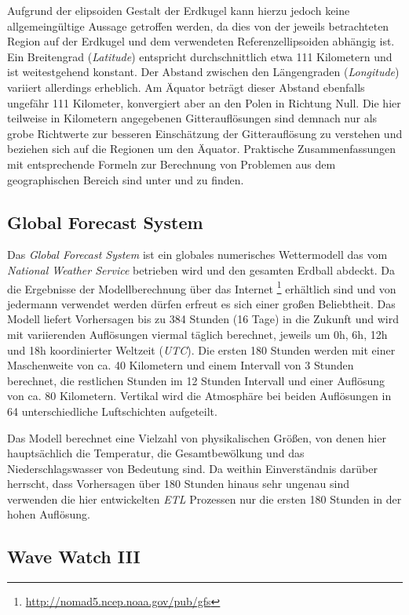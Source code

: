Aufgrund der elipsoiden Gestalt der Erdkugel kann hierzu jedoch keine
allgemeingültige Aussage getroffen werden, da dies von der jeweils
betrachteten Region auf der Erdkugel und dem verwendeten
Referenzellipsoiden abhängig ist. Ein Breitengrad (\textit{Latitude})
entspricht durchschnittlich etwa 111 Kilometern und ist weitestgehend
konstant. Der Abstand zwischen den Längengraden (\textit{Longitude})
variiert allerdings erheblich. Am Äquator beträgt dieser Abstand
ebenfalls ungefähr 111 Kilometer, konvergiert aber an den Polen in
Richtung Null. Die hier teilweise in Kilometern angegebenen
Gitterauflösungen sind demnach nur als grobe Richtwerte zur besseren
Einschätzung der Gitterauflösung zu verstehen und beziehen sich auf
die Regionen um den Äquator. Praktische Zusammenfassungen mit
entsprechende Formeln zur Berechnung von Problemen aus dem
geographischen Bereich sind unter \cite{aviation} und
\cite{movable_type_scripts} zu finden.

\subsection{Global Forecast System}

Das \textit{Global Forecast System} ist ein globales numerisches
Wettermodell das vom \textit{National Weather Service} betrieben wird
und den gesamten Erdball abdeckt. Da die Ergebnisse der
Modellberechnung über das Internet
\footnote{\url{http://nomad5.ncep.noaa.gov/pub/gfs}} erhältlich sind
und von jedermann verwendet werden dürfen erfreut es sich einer großen
Beliebtheit. Das Modell liefert Vorhersagen bis zu 384 Stunden (16
Tage) in die Zukunft und wird mit variierenden Auflösungen viermal
täglich berechnet, jeweils um 0h, 6h, 12h und 18h koordinierter
Weltzeit (\textit{UTC}). Die ersten 180 Stunden werden mit einer
Maschenweite von ca. 40 Kilometern und einem Intervall von 3 Stunden
berechnet, die restlichen Stunden im 12 Stunden Intervall und einer
Auflösung von ca. 80 Kilometern. Vertikal wird die Atmosphäre bei
beiden Auflösungen in 64 unterschiedliche Luftschichten aufgeteilt.

Das Modell berechnet eine Vielzahl von physikalischen Größen, von
denen hier hauptsächlich die Temperatur, die Gesamtbewölkung und das
Niederschlagswasser von Bedeutung sind. Da weithin Einverständnis
darüber herrscht, dass Vorhersagen über 180 Stunden hinaus sehr
ungenau sind verwenden die hier entwickelten \textit{ETL} Prozessen
nur die ersten 180 Stunden in der hohen Auflösung.

\subsection{Wave Watch III}

